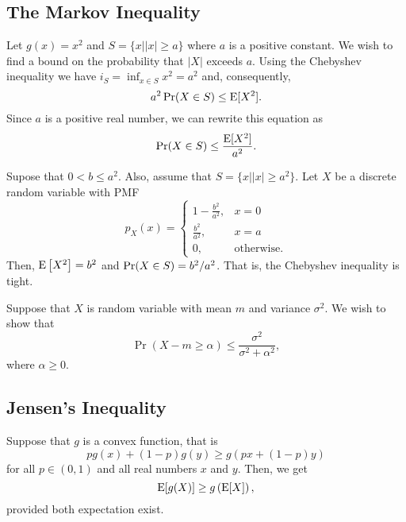 \subsection{The Markov Inequality}

Let $g(x) = x^2$ and $S = \{ x | |x| \geq a \}$ where $a$ is a positive constant.
We wish to find a bound on the probability that $|X|$ exceeds $a$.
Using the Chebyshev inequality we have $i_S = \inf_{x \in S} x^2 = a^2$ and, consequently,
\begin{equation*}
a^2 \Pr (X \in S) \leq \mathrm{E} [X^2] .
\end{equation*}
Since $a$ is a positive real number, we can rewrite this equation as
\begin{equation*}
\Pr (X \in S) \leq \frac{\mathrm{E} [X^2]}{a^2} .
\end{equation*}

\begin{example}
Supose that $0 < b \leq a^2$.
Also, assume that $S = \{ x | |x| \geq a^2 \}$.
Let $X$ be a discrete random variable with PMF
\begin{equation*}
p_X (x) = \left\{ \begin{array}{ll} 1 - \frac{b^2}{a^2}, & x = 0 \\
\frac{b^2}{a^2}, & x = a \\
0, & \text{otherwise.} \end{array} \right.
\end{equation*}
Then, $\mathrm{E} \left[ X^2 \right] = b^2$ and $\Pr (X \in S) = b^2 / a^2$.
That is, the Chebyshev inequality is tight.
\end{example}

\newpage

\begin{example}
Suppose that $X$ is random variable with mean $m$ and variance $\sigma^2$.
We wish to show that
\begin{equation*}
\Pr ( X - m \geq \alpha ) \leq \frac{\sigma^2}{\sigma^2 + \alpha^2},
\end{equation*}
where $\alpha \geq 0$.
\end{example}


\subsection{Jensen's Inequality}

Suppose that $g$ is a convex function, that is
\begin{equation*}
p g(x) + (1-p) g(y) \geq g(px + (1-p)y)
\end{equation*}
for all $p \in (0,1)$ and all real numbers $x$ and $y$.
Then, we get
\begin{equation*}
\mathrm{E} [g(X)] \geq g \left( \mathrm{E} [X] \right) ,
\end{equation*}
provided both expectation exist.


